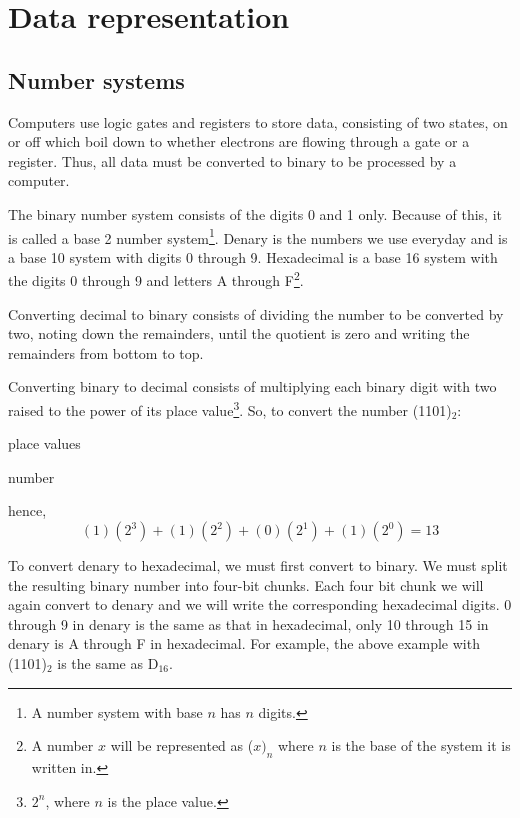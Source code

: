 \section{Data representation}
\subsection{Number systems}
Computers use logic gates and registers to store data, consisting of two states, on or off which 
boil down to whether electrons are flowing through a gate or a register. Thus, all data must be
converted to binary to be processed by a computer.

The binary number system consists of the digits 0 and 1 only. Because of this, it is called a 
base 2 number system\footnote{A number system with base $n$ has $n$ digits.}. Denary is the numbers
we use everyday and is a base 10 system with digits 0 through 9. Hexadecimal is a base 16 system
with the digits 0 through 9 and letters A through F\footnote{A number $x$ will be represented as 
($x)_n$ where $n$ is the base of the system it is written in.}.

Converting decimal to binary consists of dividing the number to be converted by two, noting down
the remainders, until the quotient is zero and writing the remainders from bottom to top.

Converting binary to decimal consists of multiplying each binary digit with two raised to the power
of its place value\footnote{$2^n$, where $n$ is the place value.}. So, to convert the number
(1101)$_2$:

\begin{minipage}{.5\textwidth}
	\begin{flushright}
		   

		\fbox{1}   
	\end{flushright}
\end{minipage}
\begin{minipage}{.5\textwidth}
	place values

	number
\end{minipage}
hence,
$$
	(1) (2^3) + (1) (2^2) +(0) (2^1) + (1) (2^0) = 13
$$

To convert denary to hexadecimal, we must first convert to binary. We must split the resulting 
binary number into four-bit chunks. Each four bit chunk we will again convert to denary and we will
write the corresponding hexadecimal digits. 0 through 9 in denary is the same as that in 
hexadecimal, only 10 through 15 in denary is A through F in hexadecimal. For example, the above
example with (1101)$_2$ is the same as D$_{16}$.

